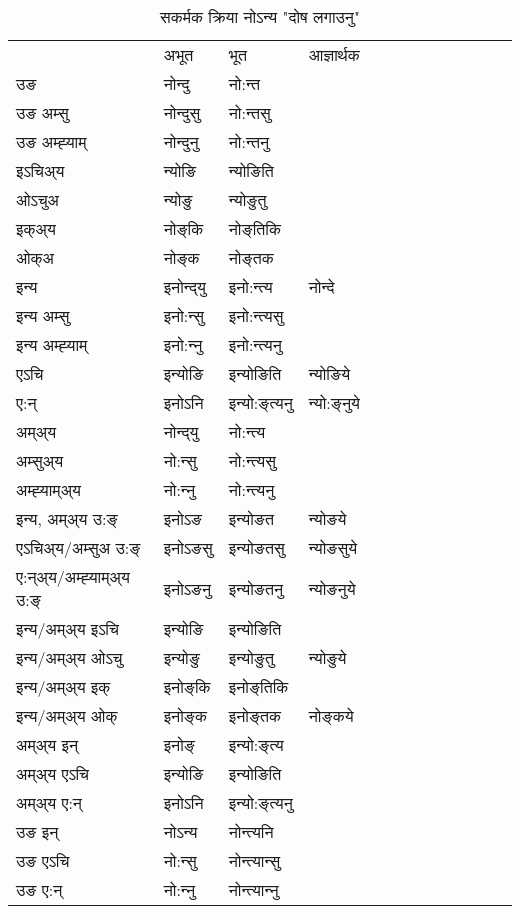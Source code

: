 \begin{table}[H]
\label{oŋt.vt} \centering
\caption{सकर्मक क्रिया  नोऽन्य  "दोष लगाउनु"  }
\begin{tabular}{l|l|l|l|l|l|l|l|l|l|l|l|l}  \toprule
&अभूत & भूत & आज्ञार्थक \\ 
उङ &नोन्दु &नो:न्त \\ 
उङ अम्सु&नोन्दुसु &नो:न्तसु \\ 
उङ अम्ह्‍याम्&नोन्दुनु &नो:न्तनु \\ 
इऽचिअ्य &न्योङि &न्योङिति   \\ 
ओऽचुअ        &न्योङु &न्योङुतु   \\ 
इक्अ्य&नोङ्‌कि &नोङ्‌तिकि   \\ 
ओक्अ &नोङ्‌क &नोङ्‌तक   \\ 
इन्य & इनोन्द्‌यु  & इनो:न्त्य &नोन्दे  \\ 
इन्य अम्सु& इनो:न्सु  & इनो:न्त्यसु   \\ 
इन्य अम्ह्‍याम्& इनो:न्‍नु  & इनो:न्त्यनु   \\ 
एऽचि & इन्योङि & इन्योङिति &न्योङिये    \\ 
ए:न् & इनोऽनि  & इन्यो:ङ्‌त्यनु &न्यो:ङ्‌नुये  \\ 
अम्अ्य & नोन्द्‌यु  & नो:न्त्य  \\ 
अम्सुअ्य & नो:न्सु & नो:न्त्यसु  \\ 
अम्ह्‍याम्अ्य & नो:न्‍नु  & नो:न्त्यनु \\ 
\midrule
इन्य, अम्अ्य उ:ङ्‌ &इनोऽङ &इन्योङत &न्योङये \\ 
एऽचिअ्य/अम्सुअ उ:ङ्‌ &इनोऽङसु &इन्योङतसु &न्योङसुये \\ 
ए:न्अ्य/अम्ह्‍याम्अ्य उ:ङ्‌ &इनोऽङनु &इन्योङतनु &न्योङनुये \\ 
इन्य/अम्अ्य इऽचि &इन्योङि &इन्योङिति    \\ 
इन्य/अम्अ्य ओऽचु &इन्योङु &इन्योङुतु  &न्योङुये  \\ 
इन्य/अम्अ्य इक् &इनोङ्‌कि &इनोङ्‌तिकि   \\ 
इन्य/अम्अ्य ओक् &इनोङ्‌क &इनोङ्‌तक  &नोङ्‌कये  \\ 
अम्अ्य इन् & इनोङ्‌ & इन्यो:ङ्‌त्य   \\ 
अम्अ्य एऽचि & इन्योङि & इन्योङिति    \\ 
अम्अ्य ए:न् & इनोऽनि  & इन्यो:ङ्‌त्यनु  \\ 
\midrule
उङ इन् & नोऽन्य  & नोन्त्यनि  \\ 
उङ एऽचि & नो:न्सु  & नोन्त्यान्सु   \\ 
उङ ए:न्& नो:न्‍नु  & नोन्त्यान्‍नु   \\ 
\bottomrule
\end{tabular}
\end{table}



